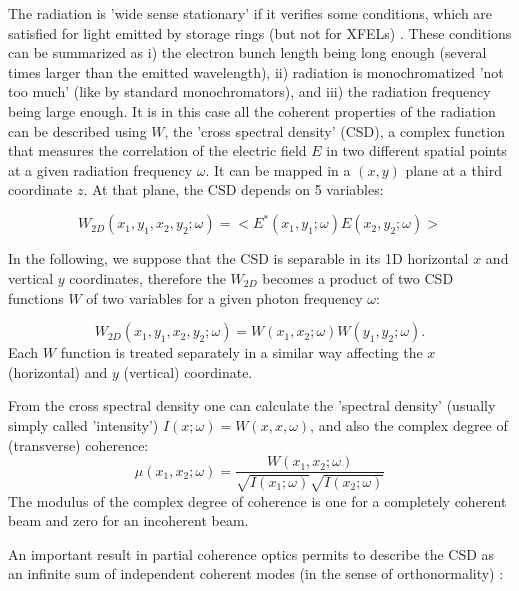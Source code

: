 \documentclass{iucr}              %
\begin{document}
The radiation is 'wide sense stationary' \cite{mandel_wolf} if it verifies some conditions, which are satisfied for light emitted by storage rings (but not for XFELs) \cite{geloni2008}. These conditions can be summarized as
i) the electron bunch length being long enough (several times larger than the emitted wavelength),
ii) radiation is monochromatized 'not too much' (like by standard monochromators), and 
iii) the radiation frequency being large enough.
It is in this case all the coherent properties of the radiation can be described using $W$, the 'cross spectral density' (CSD), a complex function that measures the correlation of the electric field $E$ in two different spatial points at a given radiation frequency $\omega$. It can be mapped in a $(x,y)$ plane at a third coordinate $z$. At that plane, the CSD depends on 5 variables: 

\begin{equation}
W_{2D}(x_1,y_1,x_2,y_2;\omega) = <E^*(x_1,y_1;\omega) E(x_2,y_2;\omega)>
\label{eq:CSD_1D}
\end{equation}

In the following, we suppose that the CSD is separable in its 1D horizontal $x$ and vertical $y$ coordinates, therefore the $W_{2D}$ becomes a product of two CSD functions $W$ of two variables for a given photon frequency $\omega$:

\begin{equation}
W_{2D}(x_1,y_1,x_2,y_2;\omega) = W(x_1,x_2;\omega) W(y_1,y_2;\omega).
\label{eq:CSD_2D}
\end{equation}
Each $W$ function is treated separately in a similar way affecting the $x$ (horizontal) and $y$ (vertical) coordinate.

From the cross spectral density one can calculate the 'spectral density' (usually simply called 'intensity') $I(x;\omega)=W(x,x,\omega)$, and also the complex degree of (transverse) coherence: 
\begin{equation}
\mu(x_1,x_2;\omega) = \frac{W(x_1,x_2;\omega)}{\sqrt{I(x_1;\omega)}\sqrt{I(x_2;\omega)}}
\label{eq:DTC}
\end{equation}
The modulus of the complex degree of coherence is one for a completely coherent beam and zero for an incoherent beam. 

An important result in partial coherence optics permits to describe the CSD as an infinite sum of independent coherent modes (in the sense of orthonormality) :
\end{document}
